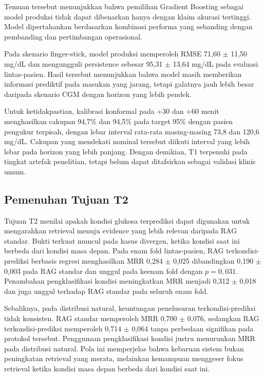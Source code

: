 Temuan tersebut menunjukkan bahwa pemilihan Gradient Boosting sebagai model produksi tidak dapat dibenarkan hanya dengan klaim akurasi tertinggi.
Model dipertahankan berdasarkan kombinasi performa yang sebanding dengan pembanding dan pertimbangan operasional.

Pada skenario finger-stick, model produksi memperoleh RMSE 71,60 $\pm$ 11,50 mg/dL dan mengungguli persistence sebesar 95,31 $\pm$ 13,64 mg/dL pada
evaluasi lintas-pasien. Hasil tersebut menunjukkan bahwa model masih memberikan informasi prediktif pada masukan yang jarang, tetapi galatnya jauh lebih besar
daripada skenario CGM dengan horizon yang lebih pendek.

Untuk ketidakpastian, kalibrasi konformal pada +30 dan +60 menit menghasilkan cakupan 94,7\% dan 94,5\% pada target 95\% dengan pasien pengukur
terpisah, dengan lebar interval rata-rata masing-masing 73,8 dan 120,6 mg/dL. Cakupan yang mendekati nominal tersebut diikuti interval yang lebih
lebar pada horizon yang lebih panjang.
Dengan demikian, T1 terpenuhi pada tingkat artefak penelitian, tetapi belum dapat ditafsirkan sebagai validasi klinis umum.

\subsection{Pemenuhan Tujuan T2}
\label{subsec:bab6-pemenuhan-t2}

Tujuan T2 menilai apakah kondisi glukosa terprediksi dapat digunakan untuk mengarahkan retrieval menuju evidence yang lebih relevan daripada
RAG standar. Bukti terkuat muncul pada kasus divergen, ketika kondisi saat ini berbeda dari kondisi masa depan. Pada enam fold lintas-pasien,
RAG terkondisi-prediksi berbasis regresi menghasilkan MRR 0,284 $\pm$ 0,025 dibandingkan 0,190 $\pm$ 0,003 pada RAG standar dan unggul pada keenam fold
dengan $p=0,031$. Penambahan pengklasifikasi kondisi meningkatkan MRR menjadi 0,312 $\pm$ 0,018 dan juga unggul terhadap RAG standar pada seluruh enam fold.

Sebaliknya, pada distribusi natural, keuntungan penelusuran terkondisi-prediksi tidak konsisten. RAG standar memperoleh MRR 0,700 $\pm$ 0,076,
sedangkan RAG terkondisi-prediksi memperoleh 0,714 $\pm$ 0,064 tanpa perbedaan signifikan pada protokol tersebut. Penggunaan pengklasifikasi kondisi
justru menurunkan MRR pada distribusi natural. Pola ini memperjelas bahwa kebaruan sistem bukan peningkatan retrieval yang merata, melainkan kemampuan
menggeser fokus retrieval ketika kondisi masa depan berbeda dari kondisi saat ini.

